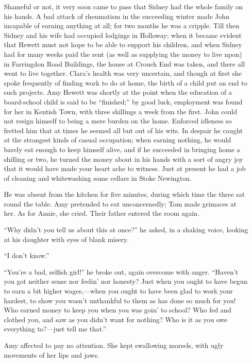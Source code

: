 Shameful or not, it very soon came to pass that Sidney had the whole
family on his hands. {}A bad attack of rheumatism in the succeeding
winter made John incapable of earning anything at all; for two months he
was a cripple. Till then Sidney and his wife had occupied lodgings in
Holloway; when it became evident that Hewett must not hope to be able to
support his children, and when Sidney had for many weeks paid the rent
(as well as supplying the money to live npon) in Farringdon Road
Buildings, the house at Crouch End was taken, and there all went to live
together. Clara's health was very uncertain, and though at first she
spoke frequently of finding work to do at home, the birth of a child put
an end to such projects. Amy Hewett was shortly at the point when the
education of a board-school child is said to be ``finished;'' by good
luck, employment was found for her in Kentish Town, with three shillings
a week from the first. John could not resign himself to being a mere
burden on the home. Enforced idleness so fretted him that at times he
seemed all but out of his wits. In despair he caught at the strangest
kinds of casual occupation; when earning nothing, he would barely eat
enough to keep himself alive, and if he succeeded in bringing {}home a
shilling or two, he turned the money about in his hands with a sort of
angry joy that it would have made your heart ache to witness. Just at
present he had a job of cleaning and whitewashing some cellars in Stoke
Newington.

He was absent from the kitchen for five minutes, during which time the
three sat round the table. Amy pretended to eat unconcernedly; Tom made
grimaces at her. As for Annie, she cried. Their father entered the room
again.

``Why didn't you tell us about this at once?'' he asked, in a shaking
voice, looking at his daughter with eyes of blank misery.

``I don't know.''

``You're a bad, selfish girl!'' he broke out, again overcome with anger.
``Haven't you got neither sense nor feelin' nor honesty? Just when you
ought to have begun to earn a bit higher wages,---when you ought to have
been glad to work your hardest, to show you wasn't unthankful to them as
has done so much for you! Who earned money to keep you when you was
goin' to school? Who fed and clothed you, and saw as you didn't want
{}for nothing? Who is it as you owe everything to?---just tell me
that.''

Amy affected to pay no attention. She kept swallowing morsels, with ugly
movements of her lips and jaws.

